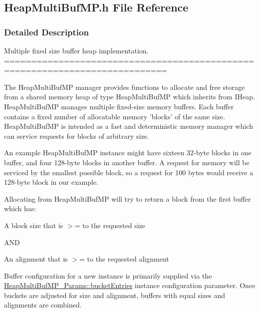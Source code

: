 \subsection{Heap\-Multi\-Buf\-M\-P.\-h File Reference}
\label{_heap_multi_buf_m_p_8h}


\subsubsection{Detailed Description}
Multiple fixed size buffer heap implementation. ============================================================================

The Heap\-Multi\-Buf\-M\-P manager provides functions to allocate and free storage from a shared memory heap of type Heap\-Multi\-Buf\-M\-P which inherits from I\-Heap. Heap\-Multi\-Buf\-M\-P manages multiple fixed-\/size memory buffers. Each buffer contains a fixed number of allocatable memory 'blocks' of the same size. Heap\-Multi\-Buf\-M\-P is intended as a fast and deterministic memory manager which can service requests for blocks of arbitrary size.

An example Heap\-Multi\-Buf\-M\-P instance might have sixteen 32-\/byte blocks in one buffer, and four 128-\/byte blocks in another buffer. A request for memory will be serviced by the smallest possible block, so a request for 100 bytes would receive a 128-\/byte block in our example.

Allocating from Heap\-Multi\-Buf\-M\-P will try to return a block from the first buffer which has\-:


\begin{DoxyEnumerate}
\item A block size that is $>$= to the requested size
\end{DoxyEnumerate}

A\-N\-D


\begin{DoxyEnumerate}
\item An alignment that is $>$= to the requested alignment
\end{DoxyEnumerate}

Buffer configuration for a new instance is primarily supplied via the \hyperlink{struct_heap_multi_buf_m_p___params_ac130e0ad7fad30d9c759af90984dee8b}{Heap\-Multi\-Buf\-M\-P\-\_\-\-Params\-::bucket\-Entries} instance configuration parameter. Once buckets are adjusted for size and alignment, buffers with equal sizes and alignments are combined.

